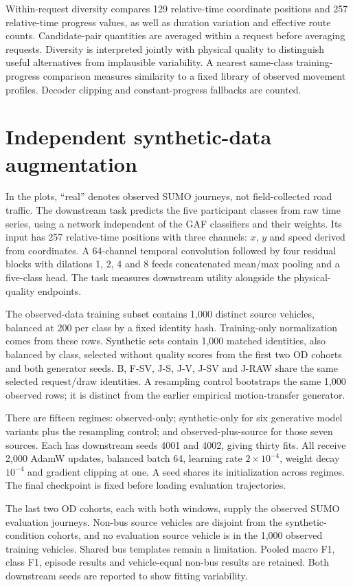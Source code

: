 Within-request diversity compares 129 relative-time coordinate positions and 257 relative-time progress values, as well as duration variation and effective route counts. Candidate-pair quantities are averaged within a request before averaging requests. Diversity is interpreted jointly with physical quality to distinguish useful alternatives from implausible variability. A nearest same-class training-progress comparison measures similarity to a fixed library of observed movement profiles. Decoder clipping and constant-progress fallbacks are counted.

\section{Independent synthetic-data augmentation}
In the plots, ``real'' denotes observed SUMO journeys, not field-collected road traffic. The downstream task predicts the five participant classes from raw time series, using a network independent of the GAF classifiers and their weights. Its input has 257 relative-time positions with three channels: $x$, $y$ and speed derived from coordinates. A 64-channel temporal convolution followed by four residual blocks with dilations 1, 2, 4 and 8 feeds concatenated mean/max pooling and a five-class head. The task measures downstream utility alongside the physical-quality endpoints.

The observed-data training subset contains 1,000 distinct source vehicles, balanced at 200 per class by a fixed identity hash. Training-only normalization comes from these rows. Synthetic sets contain 1,000 matched identities, also balanced by class, selected without quality scores from the first two OD cohorts and both generator seeds. B, F-SV, J-S, J-V, J-SV and J-RAW share the same selected request/draw identities. A resampling control bootstraps the same 1,000 observed rows; it is distinct from the earlier empirical motion-transfer generator.

There are fifteen regimes: observed-only; synthetic-only for six generative model variants plus the resampling control; and observed-plus-source for those seven sources. Each has downstream seeds 4001 and 4002, giving thirty fits. All receive 2,000 AdamW updates, balanced batch 64, learning rate $2\times10^{-4}$, weight decay $10^{-4}$ and gradient clipping at one. A seed shares its initialization across regimes. The final checkpoint is fixed before loading evaluation trajectories.

The last two OD cohorts, each with both windows, supply the observed SUMO evaluation journeys. Non-bus source vehicles are disjoint from the synthetic-condition cohorts, and no evaluation source vehicle is in the 1,000 observed training vehicles. Shared bus templates remain a limitation. Pooled macro F1, class F1, episode results and vehicle-equal non-bus results are retained. Both downstream seeds are reported to show fitting variability.

